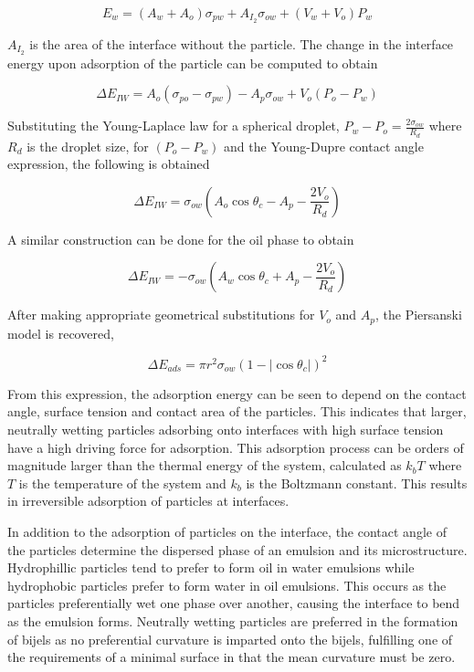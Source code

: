 \begin{equation}
    E_w = (A_w + A_o)\sigma_{pw} + A_{I_2}\sigma_{ow} + (V_w + V_o)P_w
\end{equation}

$A_{I_2}$ is the area of the interface without the particle. The change in the interface energy upon adsorption of the particle can be computed to obtain

\begin{equation}
    \Delta E_{IW} = A_o(\sigma_{po} - \sigma_{pw}) - A_p\sigma_{ow} + V_o(P_o - P_w)
\end{equation}

Substituting the Young-Laplace law for a spherical droplet, $P_w - P_o = \frac{2\sigma_{ow}}{R_d}$ where $R_d$ is the droplet size, for $(P_o - P_w)$ and the Young-Dupre contact angle
expression, the following is obtained

\begin{equation}
    \Delta E_{IW} = \sigma_{ow}(A_o\cos{\theta_c} - A_p - \frac{2 V_o}{R_d})
\end{equation}

A similar construction can be done for the oil phase to obtain 

\begin{equation}
    \Delta E_{IW} = -\sigma_{ow}(A_w\cos{\theta_c} + A_p - \frac{2 V_o}{R_d})
\end{equation}

After making appropriate geometrical substitutions for $V_o$ and $A_p$, the Piersanski model is recovered,

\begin{equation}
    \Delta E_{ads} = \pi r^2 \sigma_{ow} (1 - |\cos{\theta_c}|)^2
\end{equation}

From this expression, the adsorption energy can be seen to depend on the contact angle, surface tension and contact area of the particles. This indicates that larger, neutrally wetting
particles adsorbing onto interfaces with high surface tension have a high driving force for adsorption. \cite{ngai_particle-stabilized_2015,reeves_particle-size_2015} This adsorption process 
can be orders of magnitude larger than the thermal energy of the system, calculated as $k_b T$ where $T$ is the temperature of the system and $k_b$ is the Boltzmann constant. This results in 
irreversible adsorption of particles at interfaces. \cite{binks_pickering_2001}

In addition to the adsorption of particles on the interface, the contact angle of the particles determine the dispersed phase of an emulsion and its microstructure. 
\cite{velankar_non-equilibrium_2015}
Hydrophillic particles tend to prefer to form oil in water emulsions while hydrophobic particles prefer to form water in oil emulsions. \cite{ngai_particle-stabilized_2015}
This occurs as the particles preferentially wet one phase over another, causing the interface to bend as the emulsion forms. Neutrally wetting particles are preferred in the formation of 
bijels as no preferential curvature is imparted onto the bijels, fulfilling one of the requirements of a minimal surface in that the mean curvature must be zero. \cite{jinnai_interfacial_2001}

